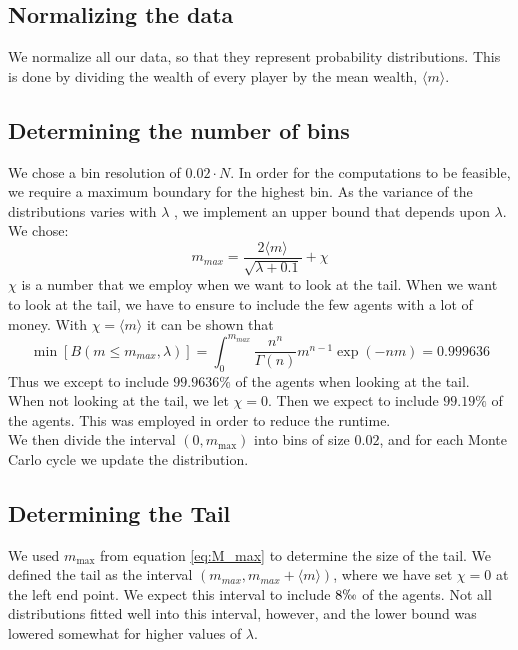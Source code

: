 \documentclass[a4paper, 10pt]{article}
\begin{document}
\subsection{Normalizing the data}
We normalize all our data, so that they represent probability distributions. This is done by dividing the wealth of every player by the mean wealth, $\langle m \rangle$. 


\subsection{Determining the number of bins}
We chose a bin resolution of $0.02 \cdot N$. In order for the computations to be feasible, we require a maximum boundary for the highest bin. As the variance of the distributions varies with $\lambda$ , we implement an upper bound that depends upon $\lambda$. We chose:
\begin{equation}\label{eq:M_max}
m_{max} = \frac{2\langle m \rangle}{\sqrt{\lambda + 0.1}} + \chi
\end{equation}
$\chi$ is a number that we employ when we want to look at the tail. When we want to look at the tail, we have to ensure to include the few agents with a lot of money. With $\chi = \langle m \rangle$ it can be shown that
\begin{equation}
\min[B(m\leq m_{max},\lambda)] = \int_0^{m_{max}} \frac{n^n}{\Gamma(n)}m^{n-1}\exp(-nm) = 0.999636 
\end{equation}
Thus we except to include $99.9636 \%$ of the agents when looking at the tail. \\
\linebreak
When not looking at the tail, we let $\chi = 0$. Then we expect to include $99.19\%$ of the agents. This was employed in order to reduce the runtime. \\
\linebreak
We then divide the interval $(0,m_{\max})$ into bins of size $0.02$, and for each Monte Carlo cycle we update the distribution.
\subsection{Determining the Tail}\label{Tail_section}
We used $m_{\max}$ from equation \ref{eq:M_max} to determine the size of the tail. We defined the tail as the interval $(m_{max},m_{max}+\langle m \rangle)$, where we have set $\chi=0$ at the left end point. We expect this interval to include $8 \permil$ of the agents. Not all distributions fitted well into this interval, however, and the lower bound was lowered somewhat for higher values of $\lambda$.
\end{document}
